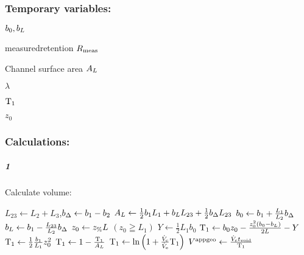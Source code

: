 \subsubsection*{Temporary variables:}
\begin{multicols}{3}
  \begin{packed_item}
    \item $b_0, b_L$
    \item measured\enspace retention $R_\text{meas}$
    \item Channel surface area $A_L$
    \item $\lambda$
    \item $\text{T}_{1}$\textbf{}
    \item $z_0$
  \end{packed_item}
\end{multicols}

\subsubsection*{Calculations:}
\textbf{}
\subparagraph{1}
Calculate volume:


\begin{algorithmic}
  \State $L_{23} \leftarrow L_2 + L_3$,\qquad $b_\Delta \leftarrow b_1 - b_2$  
  \State $A_L \leftarrow \frac{1}{2} b_1 L_1 + b_L L_{23} + \frac{1}{2} b_\Delta L_{23}$
  \State $b_0 \leftarrow b_1 + \frac{L_1}{L_2}b_\Delta$
  \State $b_L \leftarrow b_1 - \frac{L_{23}}{L_2}b_\Delta$
  \State $z_0 \leftarrow z_\text{\%} L$
\If $(z_0 \geqq L_1)$
  \State $Y \leftarrow \frac{1}{2} L_1 b_0$
    \State $\text{T}_{1} \leftarrow b_0 z_0 
  - \frac{ z_0^2 (b_0 - b_L) }{ 2L } - Y $
\Else
    \State $\text{T}_{1} \leftarrow \frac{1}{2} \frac{b_1}{L_1} z_0^2 $
\EndIf
  \State $\text{T}_{1} \leftarrow 1 - \frac{\text{T}_{1}}{A_L} $
  \State $\text{T}_{1} \leftarrow \ln{\left( 1 + \frac{\ensuremath{\dot{V}_\text{c}}}{\ensuremath{\dot{V}_\text{e}}} \ensuremath{\text{T}_{1}} \right)}$
  \State $V^{\text{appgeo}} \leftarrow \frac{\dot{V}_\text{c}t_\text{void}}{\text{T}_{1}}$
\end{algorithmic}

